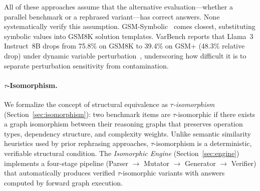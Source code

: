 All of these approaches assume that the alternative evaluation---whether
a parallel benchmark or a rephrased variant---has correct answers. None
systematically verify this assumption. GSM-Symbolic~\cite{mirzadeh2024gsmsymbolic}
comes closest, substituting symbolic values into GSM8K solution
templates. VarBench reports that Llama~3 Instruct~8B drops from
75.8\% on GSM8K to 39.4\% on GSM+ (48.3\% relative drop) under
dynamic variable perturbation~\cite{qian2024varbench}, underscoring
how difficult it is to separate perturbation sensitivity from
contamination.

\paragraph{$\tau$-Isomorphism.}
We formalize the concept of structural equivalence as
\emph{$\tau$-isomorphism} (Section~\ref{sec:isomorphism}): two
benchmark items are $\tau$-isomorphic if there exists a graph
isomorphism between their reasoning graphs that preserves operation
types, dependency structure, and complexity weights. Unlike semantic
similarity heuristics used by prior rephrasing approaches,
$\tau$-isomorphism is a deterministic, verifiable structural condition.
The \emph{Isomorphic Engine} (Section~\ref{sec:engine}) implements a
four-stage pipeline (Parser $\to$ Mutator $\to$ Generator $\to$
Verifier) that automatically produces verified $\tau$-isomorphic
variants with answers computed by forward graph execution.

